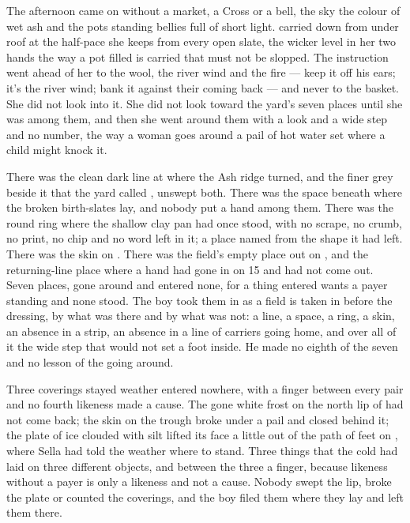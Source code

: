 The afternoon came on without a market, a Cross or a bell, the sky the colour of wet ash and the pots standing bellies full of short light.  carried  down from under  roof at the half-pace she keeps from every open slate, the wicker level in her two hands the way a pot filled is carried that must not be slopped. The instruction went ahead of her to the wool, the river wind and the fire --- keep it off his ears; it's the river wind; bank it against their coming back --- and never to the basket. She did not look into it. She did not look toward the yard's seven places until she was among them, and then she went around them with a look and a wide step and no number, the way a woman goes around a pail of hot water set where a child might knock it.

There was the clean dark line at  where the Ash ridge turned, and the finer grey beside it that the yard called , unswept both. There was the space beneath  where the broken birth-slates lay, and nobody put a hand among them. There was the round ring where the shallow clay pan had once stood, with no scrape, no crumb, no print, no chip and no word left in it; a place named from the shape it had left. There was the skin on . There was the field's empty place out on , and the returning-line place where a hand had gone in on  15 and had not come out. Seven places, gone around and entered none, for a thing entered wants a payer standing and none stood. The boy took them in as a field is taken in before the dressing, by what was there and by what was not: a line, a space, a ring, a skin, an absence in a strip, an absence in a line of carriers going home, and over all of it the wide step that would not set a foot inside. He made no eighth of the seven and no lesson of the going around.

Three coverings stayed weather entered nowhere, with a finger between every pair and no fourth likeness made a cause. The gone white frost on the north lip of  had not come back; the skin on the trough broke under a pail and closed behind it; the plate of ice clouded with silt lifted its face a little out of the path of feet on , where Sella had told the weather where to stand. Three things that the cold had laid on three different objects, and between the three a finger, because likeness without a payer is only a likeness and not a cause. Nobody swept the lip, broke the plate or counted the coverings, and the boy filed them where they lay and left them there.

